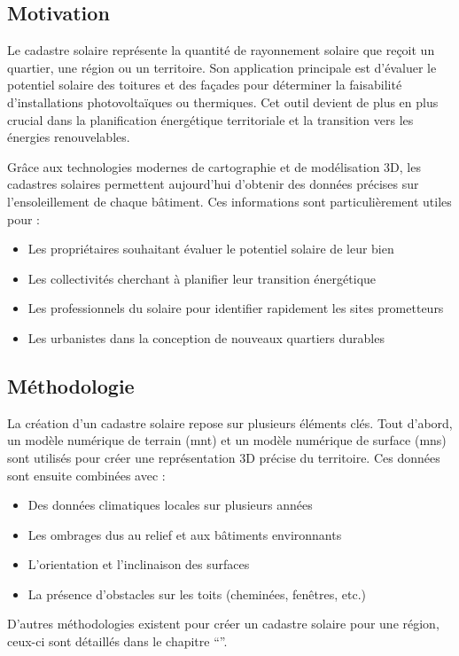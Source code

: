 \subsection{Motivation}
\par{Le cadastre solaire \cite{noauthor_solar_2022} représente la quantité de rayonnement solaire que reçoit un quartier, une région ou un territoire. Son application principale est d'évaluer le potentiel solaire des toitures et des façades pour déterminer la faisabilité d'installations photovoltaïques ou thermiques. Cet outil devient de plus en plus crucial dans la planification énergétique territoriale et la transition vers les énergies renouvelables.}
\par{Grâce aux technologies modernes de cartographie et de modélisation 3D, les cadastres solaires permettent aujourd'hui d'obtenir des données précises sur l'ensoleillement de chaque bâtiment. Ces informations sont particulièrement utiles pour :
\begin{itemize}
    \item Les propriétaires souhaitant évaluer le potentiel solaire de leur bien
    \item Les collectivités cherchant à planifier leur transition énergétique
    \item Les professionnels du solaire pour identifier rapidement les sites prometteurs
    \item Les urbanistes dans la conception de nouveaux quartiers durables
\end{itemize}}

\subsection{Méthodologie}
\par{La création d'un cadastre solaire repose sur plusieurs éléments clés. Tout d'abord, un modèle numérique de terrain (\acrshort{mnt}) et un modèle numérique de surface (\acrshort{mns}) sont utilisés pour créer une représentation 3D précise du territoire. Ces données sont ensuite combinées avec :
\begin{itemize}
    \item Des données climatiques locales sur plusieurs années
    \item Les ombrages dus au relief et aux bâtiments environnants
    \item L'orientation et l'inclinaison des surfaces
    \item La présence d'obstacles sur les toits (cheminées, fenêtres, etc.)
\end{itemize}}
\par{D'autres méthodologies existent pour créer un cadastre solaire pour une région, ceux-ci sont détaillés dans le chapitre ``''.}

